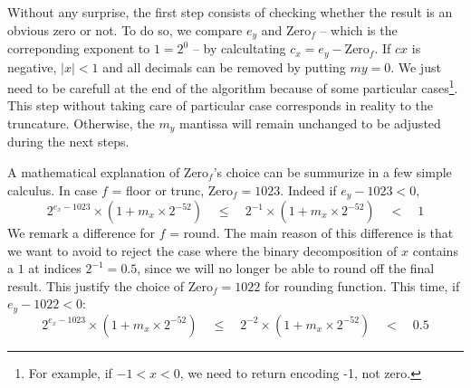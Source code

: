 \documentclass[runningheads]{llncs}
\begin{document}
      Without any surprise, the first step consists of checking whether the result is an obvious zero or not.
      To do so, we compare $e_y$ and Zero$_f$ -- which is the correponding exponent to  $1=2^0$ -- by calcultating $c_x = e_y - \text{Zero}_f$.
      If $cx$ is negative, $\mid x \mid <1$ and all decimals can be removed by putting $my = 0$.
      We just need to be carefull at the end of the algorithm because of some particular cases\footnote{For example, if $-1<x<0$, we need to return encoding -1, not zero.}.
      This step without taking care of particular case corresponds in reality to the truncature.
      Otherwise, the $m_y$ mantissa will remain unchanged to be adjusted during the next steps.

      A mathematical explanation of Zero$_f$'s choice can be summurize in a few simple calculus.
      In case $f$ = floor or trunc, Zero$_f = 1023$.
      Indeed if $e_y -1023 <0$, $$2^{e_x-1023} \times (1+m_x\times 2^{-52})\quad\leq \quad 2^{-1} \times (1+m_x\times 2^{-52}) \quad< \quad 1$$ 
      We remark a difference for $f$ = round.
      The main reason of this difference is that we want to avoid to reject the case where the binary decomposition of $x$ contains a $1$ at indices $2^{-1} = 0.5$, 
      since we will no longer be able to round off the final result.
      This justify the choice of  Zero$_f =1022$ for rounding function.
      This time, if $e_y -1022 <0$: 
      $$2^{e_x-1023} \times (1+m_x\times 2^{-52})\quad\leq \quad 2^{-2} \times (1+m_x\times 2^{-52}) \quad< \quad 0.5$$ 
      
\end{document}
